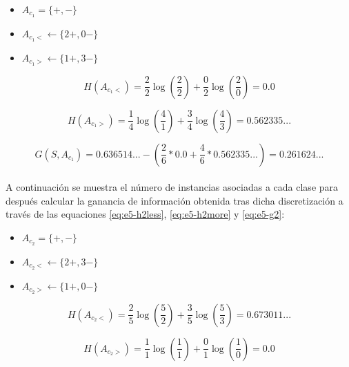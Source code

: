 \documentclass[10pt, a4paper,spanish]{article}
\begin{document}
		\begin{itemize}
			\setlength\itemsep{0em}
			\item $A_{c_1} = \{ +, - \}$
			\item $A_{c_1 <} \leftarrow \{ 2+, 0- \}$
			\item $A_{c_1 >} \leftarrow \{ 1+, 3- \}$
		\end{itemize}

		\begin{equation}
			\label{eq:e5-h1less}
			H(A_{c_1 <}) = \frac{2}{2}\log(\frac{2}{2}) + \frac{0}{2}\log(\frac{2}{0}) = 0.0
		\end{equation}

		\begin{equation}
			\label{eq:e5-h1more}
			H(A_{c_1 >}) = \frac{1}{4}\log(\frac{4}{1}) + \frac{3}{4}\log(\frac{4}{3}) = 0.562335...
		\end{equation}

		\begin{equation}
			\label{eq:e5-g1}
			G(S, A_{c_1}) = 0.636514... - (\frac{2}{6} * 0.0 + \frac{4}{6} * 0.562335...) = 0.261624...
		\end{equation}

		\paragraph{}
		A continuación se muestra el número de instancias asociadas a cada clase para después calcular la ganancia de información obtenida tras dicha discretización a través de las equaciones \eqref{eq:e5-h2less},  \eqref{eq:e5-h2more} y \eqref{eq:e5-g2}:

		\begin{itemize}
			\setlength\itemsep{0em}
			\item $A_{c_2} = \{ +, - \}$
			\item $A_{c_2 <} \leftarrow \{ 2+, 3- \}$
			\item $A_{c_2 >} \leftarrow \{ 1+, 0- \}$
		\end{itemize}

		\begin{equation}
			\label{eq:e5-h2less}
			H(A_{c_2 <}) = \frac{2}{5}\log(\frac{5}{2}) + \frac{3}{5}\log(\frac{5}{3}) = 0.673011...
		\end{equation}

		\begin{equation}
			\label{eq:e5-h2more}
			H(A_{c_2 >}) = \frac{1}{1}\log(\frac{1}{1}) + \frac{0}{1}\log(\frac{1}{0}) = 0.0
		\end{equation}
\end{document}

